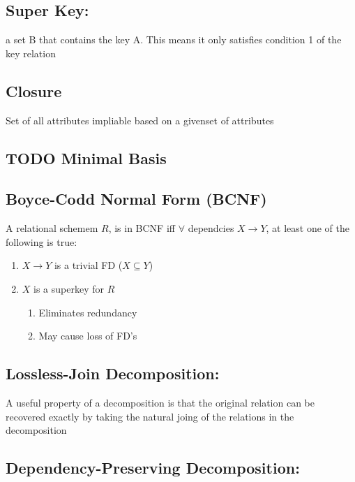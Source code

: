 \documentclass[11pt]{article}
\begin{document}
\subsection{Super Key:}
\label{sec-3.3}

   a set B that contains the key A. This means it only satisfies
   condition 1 of the key relation
\subsection{Closure}
\label{sec-3.4}

   Set of all attributes impliable based on a givenset of attributes
\subsection{\textbf{TODO} Minimal Basis}
\label{sec-3.5}

\subsection{Boyce-Codd Normal Form (BCNF)}
\label{sec-3.6}

   A relational schemem $R$, is in BCNF iff $\forall$ dependcies
   $X\rightarrow Y$, at least one of the following is true:
\begin{enumerate}
\item $X\rightarrow Y$ is a trivial FD ($X \subseteq Y$)
\item $X$ is a superkey for $R$

\begin{enumerate}
\item Eliminates redundancy
\item May cause loss of FD's
\end{enumerate}

\end{enumerate}
\subsection{Lossless-Join Decomposition:}
\label{sec-3.7}

   A useful property of a decomposition is that the original relation
   can be recovered exactly by taking the natural joing of the
   relations in the decomposition
\subsection{Dependency-Preserving Decomposition:}
\label{sec-3.8}
\end{document}
